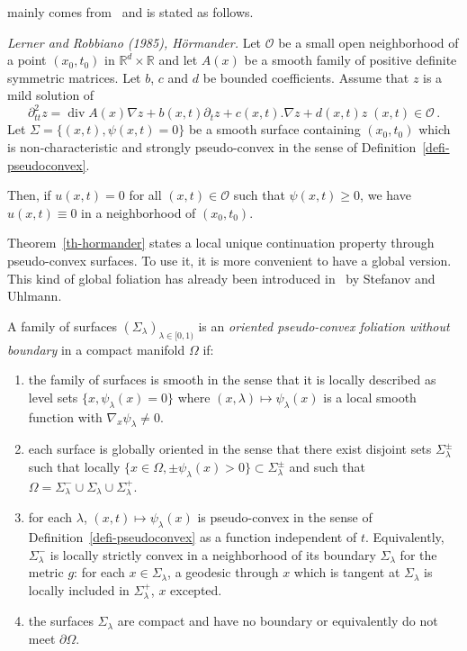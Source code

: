 \documentclass[AHL,Unicode,longabstracts]{cedram}
\newcommand{\RR}{\mathbb{R}}
\newcommand{\Oc}{\mathcal{O}}
\newcommand{\grad}{\nabla}
\renewcommand{\div}{\operatorname{div}}
\newcommand*{\romanenumi}{\renewcommand*{\theenumi}{\roman{enumi}}}
\begin{document}
\cite[Theorem~28.4.3]{Hormander} mainly comes from~\cite{LR} and is stated as follows.

\begin{theo}\label{th-hormander}
\emph{Lerner and Robbiano (1985), H\"ormander.}
Let $\Oc$ be a small open neighborhood of a point $(x_0,t_0)$ in $\RR^d\times
\RR$ and let $A(x)$ be a smooth family of positive definite symmetric matrices. Let $b$, $c$ and $d$ be bounded coefficients. Assume that $z$ is a mild solution of
\begin{equation}\label{eq-LR}
\partial^2_{tt} z=\div A(x)\grad z + b(x,t)\partial_t z+c(x,t).\grad z+d(x,t)z\;(x,t)\in\Oc\,.
\end{equation}
Let $\Sigma=\{(x,t),\psi(x,t)=0\}$ be a smooth surface containing $(x_0,t_0)$ which is non-characteristic and strongly pseudo-convex in the sense of Definition~\ref{defi-pseudoconvex}.

Then, if $u(x,t)=0$ for all $(x,t)\in\Oc$ such that $\psi(x,t)\geq 0$, we have $u(x,t)\equiv 0$ in a neighborhood of $(x_0,t_0)$.
\end{theo}

Theorem~\ref{th-hormander} states a local unique continuation property through pseudo-convex surfaces. To use it, it is more convenient to have a global version. This kind of global foliation has already been introduced in~\cite{Stefanov-Uhlmann} by Stefanov and Uhlmann.

\begin{defi}\label{defi-foliation1}
A family of surfaces $(\Sigma_\lambda)_{\lambda\in[0,1)}$ is an \emph{oriented pseudo-convex foliation without boundary} in a compact manifold $\Omega$ if:
\begin{enumerate}\romanenumi
\item \label{listdef6.4.1}the family of surfaces is smooth in the sense that it is locally described as level sets $\{x,\psi_\lambda(x)=0\}$ where $(x,\lambda)\mapsto\psi_\lambda(x)$ is a local smooth function with $\grad_x\psi_\lambda\neq 0$.
\item \label{listdef6.4.2}each surface is globally oriented in the sense that there exist disjoint sets $\Sigma_\lambda^\pm$ such that locally $\{x\in\Omega,\pm\psi_\lambda(x)> 0\}\subset \Sigma_\lambda^\pm$ and such that $\Omega=\Sigma_\lambda^- \cup
\Sigma_\lambda \cup \Sigma_\lambda^+$.
\item \label{listdef6.4.3}for each $\lambda$, $(x,t)\mapsto \psi_\lambda(x)$ is pseudo-convex in the sense of Definition~\ref{defi-pseudoconvex} as a function independent of $t$. Equivalently, $\Sigma_\lambda^-$ is locally strictly convex in a neighborhood of its boundary $\Sigma_\lambda$ for the metric $g$: for each $x\in\Sigma_\lambda$, a geodesic through $x$ which is tangent at $\Sigma_\lambda$ is locally included in $\Sigma_\lambda^+$, $x$ excepted.
\item \label{listdef6.4.4}the surfaces $\Sigma_\lambda$ are compact and have no boundary or equivalently do not meet $\partial\Omega$.
\end{enumerate}
\end{defi}
\end{document}
